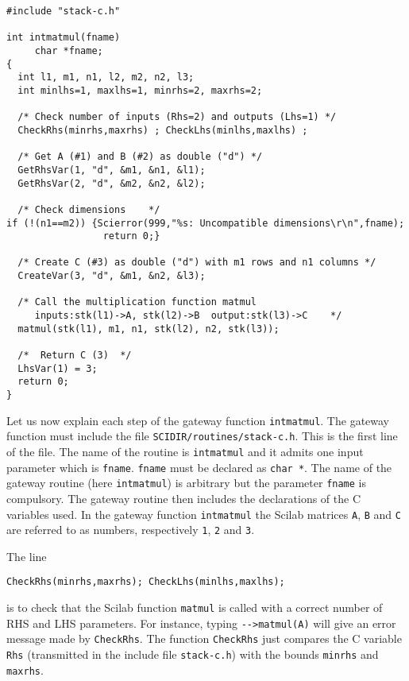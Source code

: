 \scriptsize
\begin{verbatim}
#include "stack-c.h"

int intmatmul(fname) 
     char *fname;
{
  int l1, m1, n1, l2, m2, n2, l3;
  int minlhs=1, maxlhs=1, minrhs=2, maxrhs=2;

  /* Check number of inputs (Rhs=2) and outputs (Lhs=1) */
  CheckRhs(minrhs,maxrhs) ; CheckLhs(minlhs,maxlhs) ;

  /* Get A (#1) and B (#2) as double ("d") */
  GetRhsVar(1, "d", &m1, &n1, &l1); 
  GetRhsVar(2, "d", &m2, &n2, &l2); 

  /* Check dimensions    */
if (!(n1==m2)) {Scierror(999,"%s: Uncompatible dimensions\r\n",fname);
                 return 0;}

  /* Create C (#3) as double ("d") with m1 rows and n1 columns */
  CreateVar(3, "d", &m1, &n2, &l3);   

  /* Call the multiplication function matmul
     inputs:stk(l1)->A, stk(l2)->B  output:stk(l3)->C    */
  matmul(stk(l1), m1, n1, stk(l2), n2, stk(l3));

  /*  Return C (3)  */
  LhsVar(1) = 3;
  return 0;
}
\end{verbatim}
\normalsize

Let us now explain each step of the gateway function \verb!intmatmul!.
The gateway function must include the file \verb!SCIDIR/routines/stack-c.h!.
This is the first line of the file. 
The name of the routine is \verb!intmatmul!
and it admits one input parameter which is \verb!fname!. 
\verb!fname! must be declared as \verb!char *!. The name of the gateway
routine (here \verb!intmatmul!) is arbitrary but the parameter 
\verb!fname! is compulsory.
The gateway routine then includes the declarations of the C variables used.
In the gateway function \verb!intmatmul! the Scilab matrices 
\verb!A!, \verb!B! and \verb!C! are referred to as numbers,
respectively \verb!1!, \verb!2! and \verb!3!. 

The line 
\begin{verbatim}
CheckRhs(minrhs,maxrhs); CheckLhs(minlhs,maxlhs);
\end{verbatim}
is to check that the Scilab function \verb!matmul! is called with
a correct number of RHS and LHS parameters. For instance, typing 
\verb!-->matmul(A)! will give an error message made by \verb!CheckRhs!.
The function \verb!CheckRhs! just compares the C variable \verb!Rhs!
(transmitted in the include file \verb!stack-c.h!) with the bounds
\verb!minrhs! and \verb!maxrhs!.

